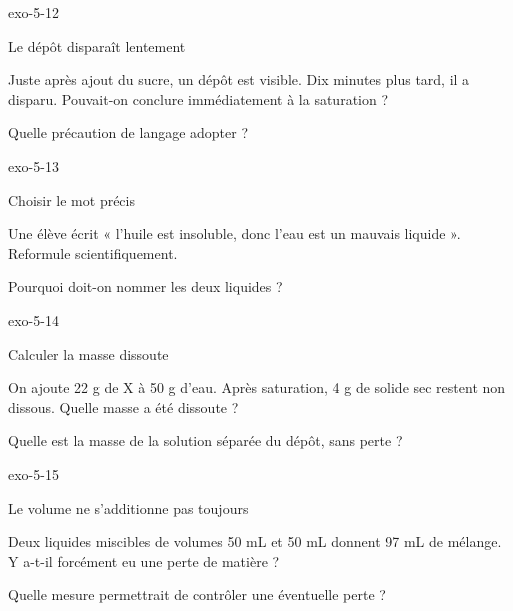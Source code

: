 \documentclass[12pt,twoside,openany]{book}
\begin{document}
\begin{blocLivre}{exo-5-12}
\begin{exercice}[3]{Le dépôt disparaît lentement}
\begin{questions}
\item Juste après ajout du sucre, un dépôt est visible. Dix minutes plus tard, il a disparu. Pouvait-on conclure immédiatement à la saturation ?
\item Quelle précaution de langage adopter ?
\end{questions}
\end{exercice}\end{blocLivre}
\begin{blocLivre}{exo-5-13}
\begin{exercice}[3]{Choisir le mot précis}
\begin{questions}
\item Une élève écrit « l’huile est insoluble, donc l’eau est un mauvais liquide ». Reformule scientifiquement.
\item Pourquoi doit-on nommer les deux liquides ?
\end{questions}
\end{exercice}\end{blocLivre}
\begin{blocLivre}{exo-5-14}
\begin{exercice}[3]{Calculer la masse dissoute}
\begin{questions}
\item On ajoute 22 g de X à 50 g d’eau. Après saturation, 4 g de solide sec restent non dissous. Quelle masse a été dissoute ?
\item Quelle est la masse de la solution séparée du dépôt, sans perte ?
\end{questions}
\end{exercice}\end{blocLivre}
\begin{blocLivre}{exo-5-15}
\begin{exercice}[3]{Le volume ne s’additionne pas toujours}
\begin{questions}
\item Deux liquides miscibles de volumes 50 mL et 50 mL donnent 97 mL de mélange. Y a-t-il forcément eu une perte de matière ?
\item Quelle mesure permettrait de contrôler une éventuelle perte ?
\end{questions}
\end{exercice}\end{blocLivre}
\end{document}
